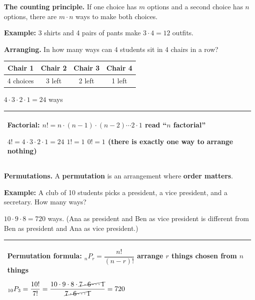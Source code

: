 \documentclass[11pt]{article}
\begin{document}

\textbf{The counting principle.} If one choice has $m$ options and a second choice has $n$ options, there are $m \cdot n$ ways to make both choices.

\vspace{0.2em}
\textbf{Example:} 3 shirts and 4 pairs of pants make $3 \cdot 4 = 12$ outfits.

\vspace{1em}
\textbf{Arranging.} In how many ways can 4 students sit in 4 chairs in a row?

\vspace{0.3em}
\begin{center}
\renewcommand{\arraystretch}{1.3}
\begin{tabular}{|c|c|c|c|}\hline
Chair 1 & Chair 2 & Chair 3 & Chair 4\\ \hline
4 choices & 3 left & 2 left & 1 left\\ \hline
\end{tabular}
\qquad $4 \cdot 3 \cdot 2 \cdot 1 = 24$ ways
\end{center}

\begin{tabular}{|>{\raggedright\arraybackslash}p{6.7in}|}\hline
\textbf{Factorial:} \; $n! = n \cdot (n - 1) \cdot (n - 2) \cdots 2 \cdot 1$ \qquad read ``$n$ factorial''\par\vspace{0.3em}
$4! = 4 \cdot 3 \cdot 2 \cdot 1 = 24$ \qquad $1! = 1$ \qquad $0! = 1$ (there is exactly one way to arrange nothing)\\ \hline
\end{tabular}

\vspace{1em}
\textbf{Permutations.} A \textbf{permutation} is an arrangement where \textbf{order matters}.

\vspace{0.2em}
\textbf{Example:} A club of 10 students picks a president, a vice president, and a secretary. How many ways?

\vspace{0.2em}
$10 \cdot 9 \cdot 8 = 720$ ways. \; (Ana as president and Ben as vice president is different from Ben as president and Ana as vice president.)

\vspace{0.6em}
\begin{tabular}{|>{\raggedright\arraybackslash}p{6.7in}|}\hline
\rule{0pt}{2.4em}\textbf{Permutation formula:} \qquad ${}_nP_r = \dfrac{n!}{(n - r)!}$ \qquad arrange $r$ things chosen from $n$ things\par\vspace{0.6em}
\rule{0pt}{2.2em}${}_{10}P_3 = \dfrac{10!}{7!} = \dfrac{10 \cdot 9 \cdot 8 \cdot \cancel{7 \cdot 6 \cdots 1}}{\cancel{7 \cdot 6 \cdots 1}} = 720$\rule[-1.4em]{0pt}{0pt}\\ \hline
\end{tabular}
\end{document}

